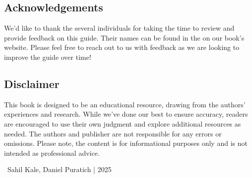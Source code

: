 \documentclass[main.tex]{subfiles}
\begin{document}
\subsection{Acknowledgements}
We'd like to thank the several individuals for taking the time to review and provide feedback on this guide. Their names can be found in the  on our book's website. Please feel free to reach out to us with feedback as we are looking to improve the guide over time!

\subsection{Disclaimer}
This book is designed to be an educational resource, drawing from the authors' experiences and research. While we've done our best to ensure accuracy, readers are encouraged to use their own judgment and explore additional resources as needed. The authors and publisher are not responsible for any errors or omissions. Please note, the content is for informational purposes only and is not intended as professional advice. \newline

\newnoindentpara \textcopyright \ Sahil Kale, Daniel Puratich | 2025
\end{document}
